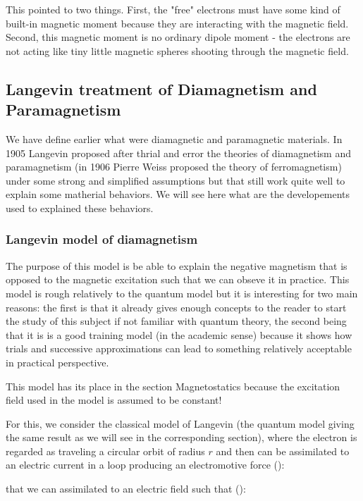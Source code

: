 	This pointed to two things. First, the "free" electrons must have some kind of built-in magnetic moment because they are interacting with the magnetic field. Second, this magnetic moment is no ordinary dipole moment - the electrons are not acting like tiny little magnetic spheres shooting through the magnetic field.
	
	\pagebreak
	\subsection{Langevin treatment of Diamagnetism and Paramagnetism}
	We have define earlier what were diamagnetic and paramagnetic materials. In 1905 Langevin proposed after thrial and error the theories of diamagnetism and paramagnetism (in 1906 Pierre Weiss proposed the theory of ferromagnetism) under some strong and simplified assumptions but that still work quite well to explain some matherial behaviors. We will see here what are the developements used to explained these behaviors.
	
	\subsubsection{Langevin model of diamagnetism}
	The purpose of this model is be able to explain the negative magnetism that is opposed to the magnetic excitation such that we can obseve it in practice. This model is rough relatively to the quantum model but it is interesting for two main reasons: the first is that it already gives enough concepts to the reader to start the study of this subject if not familiar with quantum theory, the second being that it is is a good training model (in the academic sense) because it shows how trials and successive approximations can lead to something relatively acceptable in practical perspective.
	\begin{tcolorbox}[title=Remark,colframe=black,arc=10pt]
	This model has its place in the section Magnetostatics because the excitation field used in the model is assumed to be constant!
	\end{tcolorbox}
	For this, we consider the classical model of Langevin (the quantum model giving the same result as we will see in the corresponding section), where the electron is regarded as traveling a circular orbit of radius $r$ and then can be assimilated to an electric current in a loop producing an electromotive force ():
	
	that we can assimilated to an electric field such that ():
	
